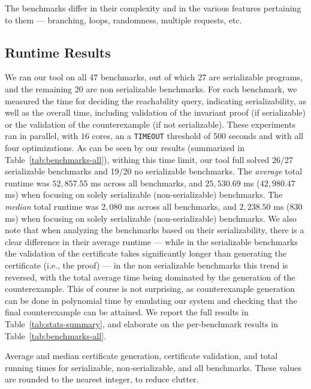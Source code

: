 The benchmarks differ in their complexity and in the various features pertaining to them --- branching, loops, randomness, multiple requests, etc. 
%

\subsection{Runtime Results}
We ran our tool on all 47 benchmarks, out of which 27 are serializable programs, and the remaining 20 are non serializable benchmarks. 
For each benchmark, we measured the time for deciding the reachability query, indicating serializability, as well as the overall time, including validation of the invariant proof (if serializable) or the validation of the counterexample (if not serializable). These experiments ran in parallel, with $16$ cores, an a \texttt{TIMEOUT} threshold of 500 seconds and with all four optimizations. As can be seen by our results (summarized in Table~\ref{tab:benchmarks-all}), withing this time limit, our tool full solved 26/27 serializable benchmarks 
and 19/20 no serializable benchmarks. 
%
The \textit{average} total runtime was $52{,}857.55$ ms across all benchmarks, and $25{,}530.69$ ms ($42{,}980.47$ ms) when focusing on solely serializable (non-serializable) benchmarks.
%
The \textit{median} total runtime was $2{,}080$ ms across all benchmarks, and $2{,}238.50$ ms ($830$ ms) when focusing on solely serializable (non-serializable) benchmarks.
%
We also note that when analyzing the benchmarks based on their serializability, there is a clear difference in their average runtime --- while in the serializable benchmarks the validation of the certificate takes significantly longer than generating the certificate (i.e., the proof) --- in the non serializable benchmarks this trend is reversed, with the total average time being dominated by the generation of the counterexample. This of course is not surprising, as counterexample generation can be done in polynomial time by emulating our  system and checking that the final counterexample can be attained.
%
We report the full results in Table~\ref{tab:stats-summary}, and elaborate on the per-benchmark results in Table~\ref{tab:benchmarks-all}.





\begin{table}[H]
	\centering
	
\caption{Average and median certificate generation, certificate validation, and total running times for serializable, non‐serializable, and all benchmarks. These values are rounded to the nearest integer, to reduce clutter.}
\label{tab:stats-summary}
\end{table}





